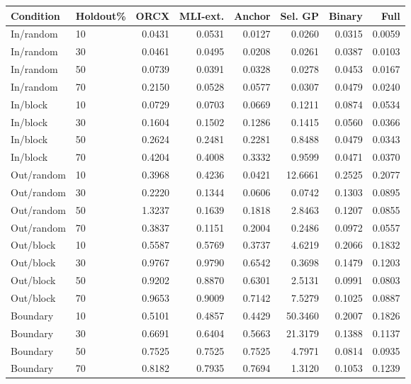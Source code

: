 \begin{tabular}{llrrrrrr}
\toprule
Condition & Holdout\% & ORCX & MLI-ext. & Anchor & Sel. GP & Binary & Full \\
\midrule
In/random & 10 & 0.0431 & 0.0531 & 0.0127 & 0.0260 & 0.0315 & 0.0059 \\
In/random & 30 & 0.0461 & 0.0495 & 0.0208 & 0.0261 & 0.0387 & 0.0103 \\
In/random & 50 & 0.0739 & 0.0391 & 0.0328 & 0.0278 & 0.0453 & 0.0167 \\
In/random & 70 & 0.2150 & 0.0528 & 0.0577 & 0.0307 & 0.0479 & 0.0240 \\
In/block & 10 & 0.0729 & 0.0703 & 0.0669 & 0.1211 & 0.0874 & 0.0534 \\
In/block & 30 & 0.1604 & 0.1502 & 0.1286 & 0.1415 & 0.0560 & 0.0366 \\
In/block & 50 & 0.2624 & 0.2481 & 0.2281 & 0.8488 & 0.0479 & 0.0343 \\
In/block & 70 & 0.4204 & 0.4008 & 0.3332 & 0.9599 & 0.0471 & 0.0370 \\
Out/random & 10 & 0.3968 & 0.4236 & 0.0421 & 12.6661 & 0.2525 & 0.2077 \\
Out/random & 30 & 0.2220 & 0.1344 & 0.0606 & 0.0742 & 0.1303 & 0.0895 \\
Out/random & 50 & 1.3237 & 0.1639 & 0.1818 & 2.8463 & 0.1207 & 0.0855 \\
Out/random & 70 & 0.3837 & 0.1151 & 0.2004 & 0.2486 & 0.0972 & 0.0557 \\
Out/block & 10 & 0.5587 & 0.5769 & 0.3737 & 4.6219 & 0.2066 & 0.1832 \\
Out/block & 30 & 0.9767 & 0.9790 & 0.6542 & 0.3698 & 0.1479 & 0.1203 \\
Out/block & 50 & 0.9202 & 0.8870 & 0.6301 & 2.5131 & 0.0991 & 0.0803 \\
Out/block & 70 & 0.9653 & 0.9009 & 0.7142 & 7.5279 & 0.1025 & 0.0887 \\
Boundary & 10 & 0.5101 & 0.4857 & 0.4429 & 50.3460 & 0.2007 & 0.1826 \\
Boundary & 30 & 0.6691 & 0.6404 & 0.5663 & 21.3179 & 0.1388 & 0.1137 \\
Boundary & 50 & 0.7525 & 0.7525 & 0.7525 & 4.7971 & 0.0814 & 0.0935 \\
Boundary & 70 & 0.8182 & 0.7935 & 0.7694 & 1.3120 & 0.1053 & 0.1239 \\
\bottomrule
\end{tabular}
